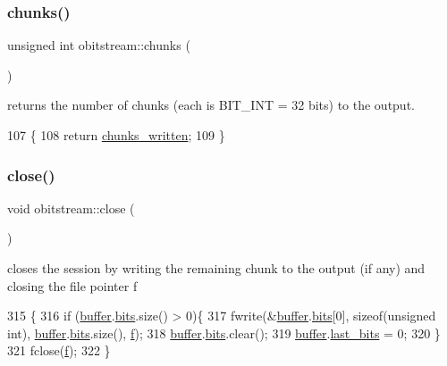 \subsubsection{\texorpdfstring{chunks()}{chunks()}}
{\footnotesize\ttfamily unsigned int obitstream\+::chunks (\begin{DoxyParamCaption}{ }\end{DoxyParamCaption})\hspace{0.3cm}{\ttfamily [inline]}}



returns the number of chunks (each is B\+I\+T\+\_\+\+I\+NT = 32 bits) to the output. 


\begin{DoxyCode}
107                        \{
108     \textcolor{keywordflow}{return} \hyperlink{classobitstream_a3022397f2b6133ea5990016d9d078a2f}{chunks\_written}; 
109   \}
\end{DoxyCode}
\mbox{\label{classobitstream_a6d76dbba302e1181fbc9609072a4c2a0}} 
\subsubsection{\texorpdfstring{close()}{close()}}
{\footnotesize\ttfamily void obitstream\+::close (\begin{DoxyParamCaption}{ }\end{DoxyParamCaption})}



closes the session by writing the remaining chunk to the output (if any) and closing the file pointer f 


\begin{DoxyCode}
315                       \{
316   \textcolor{keywordflow}{if} (\hyperlink{classobitstream_aeaccad00a395a404aa16472bfa052be3}{buffer}.\hyperlink{classbit__pipe_a86f38af1e9736b053728033490476b50}{bits}.size() > 0)\{
317     fwrite(&\hyperlink{classobitstream_aeaccad00a395a404aa16472bfa052be3}{buffer}.\hyperlink{classbit__pipe_a86f38af1e9736b053728033490476b50}{bits}[0], \textcolor{keyword}{sizeof}(\textcolor{keywordtype}{unsigned} \textcolor{keywordtype}{int}), \hyperlink{classobitstream_aeaccad00a395a404aa16472bfa052be3}{buffer}.\hyperlink{classbit__pipe_a86f38af1e9736b053728033490476b50}{bits}.size(), 
      \hyperlink{classobitstream_ac589d74745217748c888ae777ab324a7}{f});
318     \hyperlink{classobitstream_aeaccad00a395a404aa16472bfa052be3}{buffer}.\hyperlink{classbit__pipe_a86f38af1e9736b053728033490476b50}{bits}.clear();
319     \hyperlink{classobitstream_aeaccad00a395a404aa16472bfa052be3}{buffer}.\hyperlink{classbit__pipe_a0f3e84b02751803adaab499b5dad86fe}{last\_bits} = 0;
320   \}
321   fclose(\hyperlink{classobitstream_ac589d74745217748c888ae777ab324a7}{f});
322 \}
\end{DoxyCode}
\mbox{\label{classobitstream_a09352e38c7d1d5bcff438c0b8ba41ff4}} 
